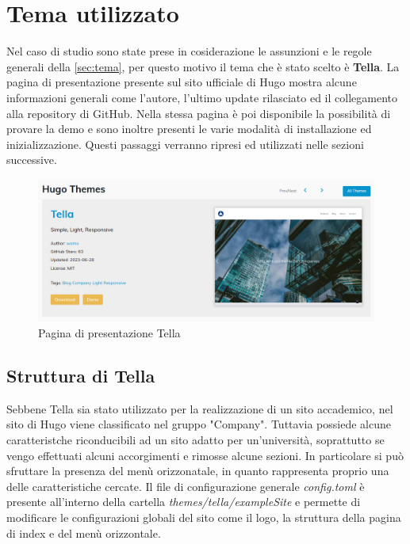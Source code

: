 \documentclass[target=bach,aauheader=]{thud}
\begin{document}
\section{Tema utilizzato}
Nel caso di studio sono state prese in cosiderazione le assunzioni e le regole generali della \cref{sec:tema}, per questo motivo il tema che è stato scelto è \textbf{Tella}.
La pagina di presentazione presente sul sito ufficiale di Hugo mostra alcune informazioni generali come l'autore, l'ultimo update rilasciato ed il collegamento alla repository di GitHub.
\newline
Nella stessa pagina è poi disponibile la possibilità di provare la demo e sono inoltre presenti le varie modalità di installazione ed inizializzazione. Questi passaggi verranno ripresi ed utilizzati nelle sezioni successive.

\begin{figure}
    \centering
    \includegraphics[width = 1\textwidth]{images/Tella.png}
    \caption{Pagina di presentazione Tella}
\end{figure}


\subsection{Struttura di Tella}
Sebbene Tella sia stato utilizzato per la realizzazione di un sito accademico, nel sito di Hugo viene classificato nel gruppo "Company". Tuttavia possiede alcune caratteristche riconducibili ad un sito adatto per un'università, soprattutto se vengo effettuati alcuni accorgimenti
e rimosse alcune sezioni. 
In particolare si può sfruttare la presenza del menù orizzonatale, in quanto rappresenta proprio una delle caratteristiche cercate. 
\newline
Il file di configurazione generale \textit{config.toml} è presente all'interno della cartella \textit{themes/tella/exampleSite} e permette di modificare le configurazioni globali del sito come il logo, la struttura della pagina di index e del menù orizzontale.
\end{document}
